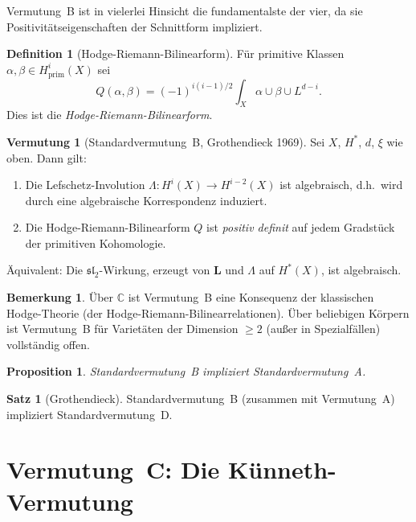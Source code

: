 \documentclass[12pt,a4paper]{amsart}
\newtheorem{proposition}[theorem]{Proposition}
\theoremstyle{definition}
\newtheorem{satz}[theorem]{Satz}
\newtheorem{vermutung}[theorem]{Vermutung}
\newtheorem{bemerkung}[theorem]{Bemerkung}
\newtheorem{definition_de}[theorem]{Definition}
\newcommand{\C}{\mathbb{C}}
\begin{document}
Vermutung~B ist in vielerlei Hinsicht die fundamentalste der vier, da sie
Positivitätseigenschaften der Schnittform impliziert.

\begin{definition_de}[Hodge-Riemann-Bilinearform]
Für primitive Klassen $\alpha, \beta \in H^i_{\mathrm{prim}}(X)$ sei
\[
  Q(\alpha, \beta) = (-1)^{i(i-1)/2} \int_X \alpha \cup \beta \cup L^{d-i}.
\]
Dies ist die \emph{Hodge-Riemann-Bilinearform}.
\end{definition_de}

\begin{vermutung}[Standardvermutung~B, Grothendieck 1969]\label{verm:B}
Sei $X$, $H^*$, $d$, $\xi$ wie oben.  Dann gilt:
\begin{enumerate}[label=(\roman*)]
  \item Die Lefschetz-Involution $\Lambda: H^i(X) \to H^{i-2}(X)$
        ist algebraisch, d.h.\ wird durch eine algebraische Korrespondenz
        induziert.
  \item Die Hodge-Riemann-Bilinearform $Q$ ist \emph{positiv definit} auf
        jedem Gradstück der primitiven Kohomologie.
\end{enumerate}
Äquivalent: Die $\mathfrak{sl}_2$-Wirkung, erzeugt von $\mathbf{L}$ und
$\Lambda$ auf $H^*(X)$, ist algebraisch.
\end{vermutung}

\begin{bemerkung}
Über $\C$ ist Vermutung~B eine Konsequenz der klassischen Hodge-Theorie
(der Hodge-Riemann-Bilinearrelationen).  Über beliebigen Körpern ist
Vermutung~B für Varietäten der Dimension $\geq 2$ (außer in Spezialfällen)
vollständig offen.
\end{bemerkung}

\begin{proposition}
Standardvermutung~B impliziert Standardvermutung~A.
\end{proposition}

\begin{satz}[Grothendieck]\label{satz:B_impliziert_D}
Standardvermutung~B (zusammen mit Vermutung~A) impliziert Standardvermutung~D.
\end{satz}

\section{Vermutung~C: Die Künneth-Vermutung}\label{sec:vermutungC}
\end{document}
